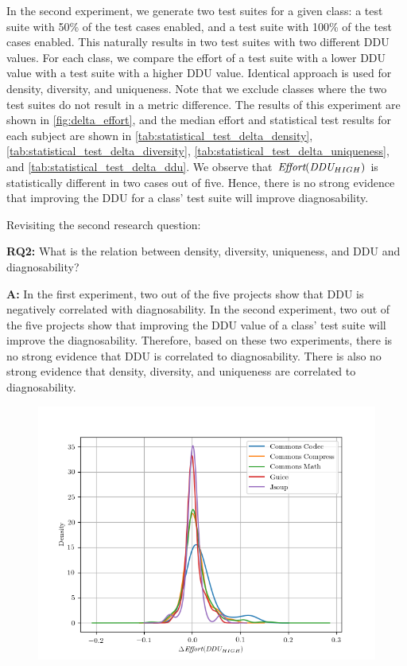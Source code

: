 \documentclass[twoside,a4paper,11pt]{memoir}
\begin{document}
In the second experiment, we generate two test suites for a given class: a test suite with 50\% of the test cases enabled, and a test suite with 100\% of the test cases enabled.
This naturally results in two test suites with two different DDU values.
For each class, we compare the effort of a test suite with a lower DDU value with a test suite with a higher DDU value.
Identical approach is used for density, diversity, and uniqueness.
Note that we exclude classes where the two test suites do not result in a metric difference.
The results of this experiment are shown in \autoref{fig:delta_effort}, and the median effort and statistical test results for each subject are shown in \autoref{tab:statistical_test_delta_density}, \autoref{tab:statistical_test_delta_diversity}, \autoref{tab:statistical_test_delta_uniqueness}, and \autoref{tab:statistical_test_delta_ddu}.
We observe that $\emph{Effort}(\emph{DDU}_{HIGH})$ is statistically different in two cases out of five.
Hence, there is no strong evidence that improving the DDU for a class' test suite will improve diagnosability.

Revisiting the second research question:
\begin{framed}
\noindent
\textbf{RQ2:} What is the relation between density, diversity, uniqueness, and DDU and diagnosability?
\end{framed}
\textbf{A:} In the first experiment, two out of the five projects show that DDU is negatively correlated with diagnosability.
In the second experiment, two out of the five projects show that improving the DDU value of a class' test suite will improve the diagnosability.
Therefore, based on these two experiments, there is no strong evidence that DDU is correlated to diagnosability.
There is also no strong evidence that density, diversity, and uniqueness are correlated to diagnosability.

\begin{figure}
  \includegraphics[width=\linewidth]{figures/delta_effort}
  \caption{}
  \label{fig:delta_effort}
\end{figure}
\end{document}
